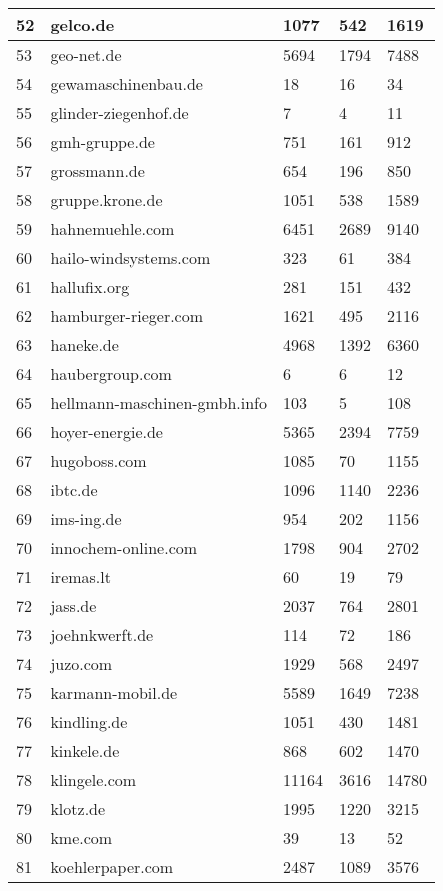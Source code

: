 \begin{longtable}{|m{0.5cm}|m{6cm}|m{2cm}|m{2cm}|m{2cm}|}
	\hline
	52 & gelco.de & 1077 & 542 & 1619\\
	\hline
	53 & geo-net.de & 5694 & 1794 & 7488\\
	\hline
	54 & gewamaschinenbau.de & 18 & 16 & 34\\
	\hline
	55 & glinder-ziegenhof.de & 7 & 4 & 11\\
	\hline
	56 & gmh-gruppe.de & 751 & 161 & 912\\
	\hline
	57 & grossmann.de & 654 & 196 & 850\\
	\hline
	58 & gruppe.krone.de & 1051 & 538 & 1589\\
	\hline
	59 & hahnemuehle.com & 6451 & 2689 & 9140\\
	\hline
	60 & hailo-windsystems.com & 323 & 61 & 384\\
	\hline
	61 & hallufix.org & 281 & 151 & 432\\
	\hline
	62 & hamburger-rieger.com & 1621 & 495 & 2116\\
	\hline
	63 & haneke.de & 4968 & 1392 & 6360\\
	\hline
	64 & haubergroup.com & 6 & 6 & 12\\
	\hline
	65 & hellmann-maschinen-gmbh.info & 103 & 5 & 108\\
	\hline
	66 & hoyer-energie.de & 5365 & 2394 & 7759\\
	\hline
	67 & hugoboss.com & 1085 & 70 & 1155\\
	\hline
	68 & ibtc.de & 1096 & 1140 & 2236\\
	\hline
	69 & ims-ing.de & 954 & 202 & 1156\\
	\hline
	70 & innochem-online.com & 1798 & 904 & 2702\\
	\hline
	71 & iremas.lt & 60 & 19 & 79\\
	\hline
	72 & jass.de & 2037 & 764 & 2801\\
	\hline
	73 & joehnkwerft.de & 114 & 72 & 186\\
	\hline
	74 & juzo.com & 1929 & 568 & 2497\\
	\hline
	75 & karmann-mobil.de & 5589 & 1649 & 7238\\
	\hline
	76 & kindling.de & 1051 & 430 & 1481\\
	\hline
	77 & kinkele.de & 868 & 602 & 1470\\
	\hline
	78 & klingele.com & 11164 & 3616 & 14780\\
	\hline
	79 & klotz.de & 1995 & 1220 & 3215\\
	\hline
	80 & kme.com & 39 & 13 & 52\\
	\hline
	81 & koehlerpaper.com & 2487 & 1089 & 3576\\

\end{longtable}
